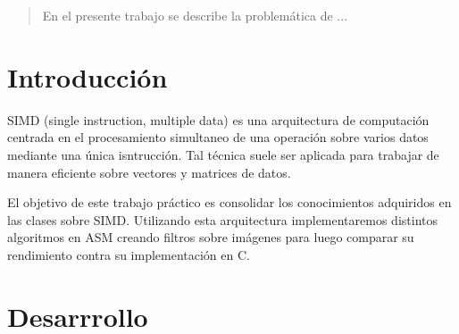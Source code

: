 \documentclass[a4paper]{article}
\begin{document}
\thispagestyle{empty}

\maketitle
\newpage

\thispagestyle{empty}
\vfill
\begin{abstract}
En el presente trabajo se describe la problemática de ...
\end{abstract}

\thispagestyle{empty}
\vspace{3cm}
\tableofcontents
\newpage


\newpage

\section{Introducción}

SIMD (single instruction, multiple data) es una arquitectura de computaci\'on centrada en el procesamiento simultaneo de una operaci\'on sobre varios datos mediante una \'unica isntrucci\'on. Tal t\'ecnica suele ser aplicada para trabajar de manera eficiente sobre vectores y matrices de datos. \par
El objetivo de este trabajo pr\'actico es consolidar los conocimientos adquiridos en las clases sobre SIMD. Utilizando esta arquitectura implementaremos distintos algoritmos en ASM creando filtros sobre imágenes para luego comparar su rendimiento contra su implementación en C.


\section{Desarrrollo}
\end{document}
